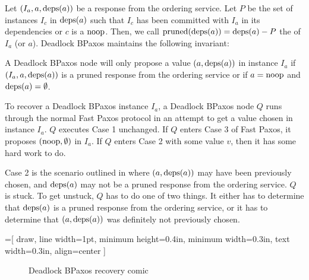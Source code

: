 \newcommand{\pruned}{\text{pruned}}
Let $(I_a, a, \text{deps}(a))$ be a response from the ordering service. Let $P$ be
the set of instances $I_c$ in $\text{deps}(a)$ such that $I_c$ has been committed
with $I_a$ in its dependencies or $c$ is a $\text{noop}$. Then, we call
$\pruned(\deps{a}) = \deps{a} - P$ the  of $I_a$
(or $a$). Deadlock BPaxos maintains the following invariant:

\begin{boxedinvariant}
  A Deadlock BPaxos node will only propose a value $(a, \text{deps}(a))$ in instance
  $I_a$ if $(I_a, a, \text{deps}(a))$ is a pruned response from the ordering service
  or if $a = \text{noop}$ and $\text{deps}(a) = \emptyset$.
\end{boxedinvariant}

To recover a Deadlock BPaxos instance $I_a$, a Deadlock BPaxos node $Q$ runs through
the normal Fast Paxos protocol in an attempt to get a value chosen in instance
$I_a$. $Q$ executes Case 1 unchanged. If $Q$ enters Case 3 of Fast Paxos, it
proposes $(\text{noop}, \emptyset)$ in $I_a$. If $Q$ enters Case 2 with some value
$v$, then it has some hard work to do.

Case 2 is the scenario outlined in  where $(a, \text{deps}(a))$
may have been previously chosen, and $\text{deps}(a)$ may not be a pruned response
from the ordering service. $Q$ is stuck. To get unstuck, $Q$ has to do one of
two things. It either has to determine that $\text{deps}(a)$ is a pruned response
from the ordering service, or it has to determine that $(a, \text{deps}(a))$ was
definitely not previously chosen.

=[%
  draw,
  line width=1pt,
  minimum height=0.4in,
  minimum width=0.3in,
  text width=0.3in,
  align=center
]
\begin{figure}[ht]
  \centering
  \caption{Deadlock BPaxos recovery comic}
\end{figure}

